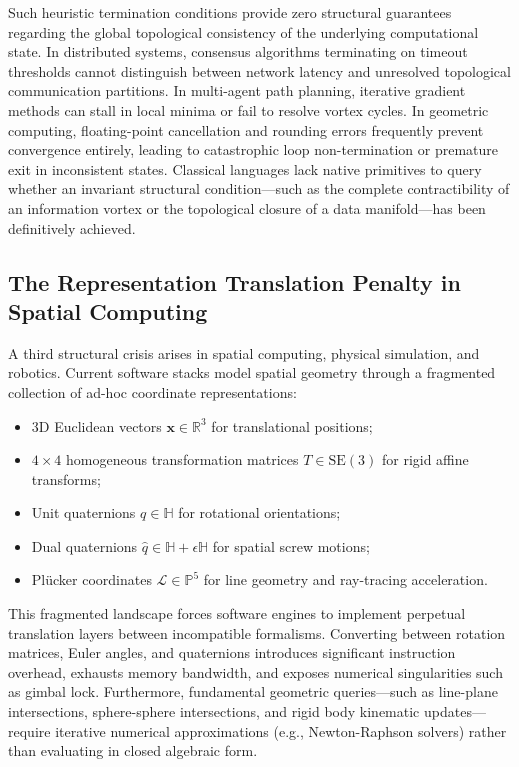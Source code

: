 Such heuristic termination conditions provide zero structural guarantees regarding the global topological consistency of the underlying computational state. In distributed systems, consensus algorithms terminating on timeout thresholds cannot distinguish between network latency and unresolved topological communication partitions. In multi-agent path planning, iterative gradient methods can stall in local minima or fail to resolve vortex cycles. In geometric computing, floating-point cancellation and rounding errors frequently prevent convergence entirely, leading to catastrophic loop non-termination or premature exit in inconsistent states. Classical languages lack native primitives to query whether an invariant structural condition---such as the complete contractibility of an information vortex or the topological closure of a data manifold---has been definitively achieved.

\subsection{The Representation Translation Penalty in Spatial Computing}
A third structural crisis arises in spatial computing, physical simulation, and robotics. Current software stacks model spatial geometry through a fragmented collection of ad-hoc coordinate representations:
\begin{itemize}[leftmargin=1.5cm]
    \item 3D Euclidean vectors $\mathbf{x} \in \mathbb{R}^3$ for translational positions;
    \item $4 \times 4$ homogeneous transformation matrices $T \in \mathrm{SE}(3)$ for rigid affine transforms;
    \item Unit quaternions $q \in \mathbb{H}$ for rotational orientations;
    \item Dual quaternions $\hat{q} \in \mathbb{H} + \epsilon \mathbb{H}$ for spatial screw motions;
    \item Plücker coordinates $\mathcal{L} \in \mathbb{P}^5$ for line geometry and ray-tracing acceleration.
\end{itemize}

This fragmented landscape forces software engines to implement perpetual translation layers between incompatible formalisms. Converting between rotation matrices, Euler angles, and quaternions introduces significant instruction overhead, exhausts memory bandwidth, and exposes numerical singularities such as gimbal lock. Furthermore, fundamental geometric queries---such as line-plane intersections, sphere-sphere intersections, and rigid body kinematic updates---require iterative numerical approximations (e.g., Newton-Raphson solvers) rather than evaluating in closed algebraic form.

